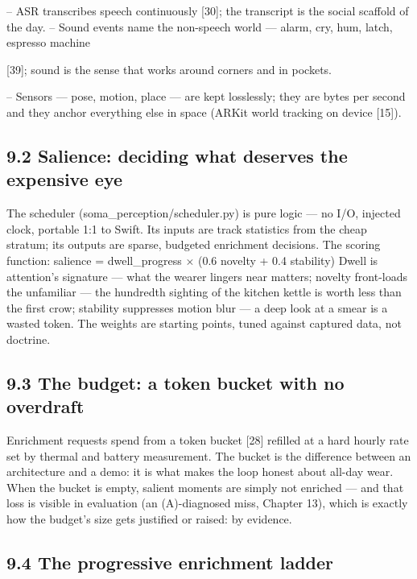 -- ASR transcribes speech continuously {[}30{]}; the transcript is the social scaffold of the day. -- Sound events name the non-speech world --- alarm, cry, hum, latch, espresso machine

{[}39{]}; sound is the sense that works around corners and in pockets.

-- Sensors --- pose, motion, place --- are kept losslessly; they are bytes per second and they anchor everything else in space (ARKit world tracking on device {[}15{]}).

\subsection{9.2 Salience: deciding what deserves the expensive eye}\label{salience-deciding-what-deserves-the-expensive-eye}

The scheduler (soma\_perception/scheduler.py) is pure logic --- no I/O, injected clock, portable 1:1 to Swift. Its inputs are track statistics from the cheap stratum; its outputs are sparse, budgeted enrichment decisions. The scoring function: salience = dwell\_progress \(\times\) (0.6 \textperiodcentered{} novelty + 0.4 \textperiodcentered{} stability) Dwell is attention's signature --- what the wearer lingers near matters; novelty front-loads the unfamiliar --- the hundredth sighting of the kitchen kettle is worth less than the first crow; stability suppresses motion blur --- a deep look at a smear is a wasted token. The weights are starting points, tuned against captured data, not doctrine.

\subsection{9.3 The budget: a token bucket with no overdraft}\label{the-budget-a-token-bucket-with-no-overdraft}

Enrichment requests spend from a token bucket {[}28{]} refilled at a hard hourly rate set by thermal and battery measurement. The bucket is the difference between an architecture and a demo: it is what makes the loop honest about all-day wear. When the bucket is empty, salient moments are simply not enriched --- and that loss is visible in evaluation (an (A)-diagnosed miss, Chapter 13), which is exactly how the budget's size gets justified or raised: by evidence.

\subsection{9.4 The progressive enrichment ladder}\label{the-progressive-enrichment-ladder}

